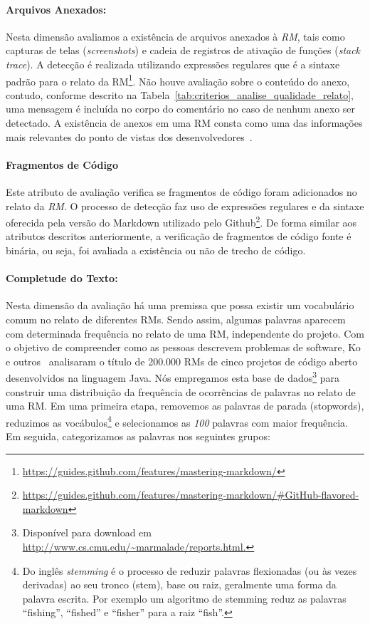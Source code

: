 \paragraph{Arquivos Anexados:}
\label{par:arquivos_anexados}

Nesta dimensão avaliamos a existência de arquivos anexados à \textit{RM}, tais
como capturas de telas (\textit{screenshots}) e cadeia de registros de ativação
de funções (\textit{stack trace}). A detecção é realizada utilizando expressões
regulares que é a sintaxe padrão para o relato da
RM\footnote{\url{https://guides.github.com/features/mastering-markdown/}}. Não
houve avaliação sobre o conteúdo do anexo, contudo, conforme descrito na
Tabela~\ref{tab:criterios_analise_qualidade_relato}, uma mensagem é incluída no
corpo do comentário no caso de nenhum anexo ser detectado. A existência de
anexos em uma RM consta como uma das informações mais relevantes do ponto de
vistas dos desenvolvedores~\cite{bettenburg2008makes}.

\paragraph{Fragmentos de Código}
\label{par:fragmentos_de_código}

Este atributo de avaliação verifica se fragmentos de código foram adicionados
no relato da \textit{RM}. O processo de detecção faz uso de expressões
regulares e da sintaxe oferecida pela versão do Markdown utilizado pelo
Github\footnote{\url{https://guides.github.com/features/mastering-markdown/\#GitHub-flavored-markdown}}.
De forma similar aos atributos descritos anteriormente, a verificação de
fragmentos de código fonte é binária, ou seja, foi avaliada a existência ou não
de trecho de código.

\paragraph{Completude do Texto:}
\label{par:completude_de_palavras_chaves}

Nesta dimensão da avaliação há uma premissa que possa existir um vocabulário
comum no relato de diferentes RMs. Sendo assim, algumas palavras aparecem com
determinada frequência no relato de uma RM, independente do projeto. Com o
objetivo de compreender como as pessoas descrevem problemas de software, Ko e
outros~\cite{ko2006linguistic} analisaram o título de 200.000 RMs de cinco
projetos de código aberto desenvolvidos na linguagem Java. Nós empregamos esta
base de dados\footnote{Disponível para download em
    \url{http://www.cs.cmu.edu/~marmalade/reports.html.}} para construir uma
distribuição da frequência de ocorrências de palavras no relato de uma RM\@.  Em
uma primeira etapa, removemos as palavras de parada (stopwords), reduzimos as
vocábulos\footnote{Do inglês \textit{stemming} é o processo de reduzir palavras
    flexionadas (ou às vezes derivadas) ao seu tronco (stem), base ou raiz,
    geralmente uma forma da palavra escrita. Por exemplo um algoritmo de
    stemming reduz as palavras ``fishing'', ``fished'' e ``fisher'' para a raiz
    ``fish''.} e selecionamos as \textit{100} palavras com maior frequência. Em
seguida, categorizamos as palavras nos seguintes grupos:

